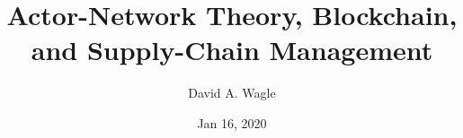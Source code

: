 \title{Actor-Network Theory, Blockchain, and Supply-Chain Management}
\author{David A. Wagle}
\date{Jan 16, 2020}

